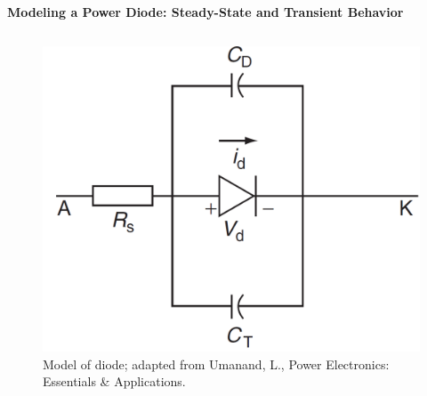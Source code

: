 \begin{frame}{\textbf{Modeling a Power Diode: Steady-State and Transient Behavior}}
\begin{columns}
\begin{column}{0.48\textwidth}
    \begin{figure}
        \centering
        \includegraphics[scale=0.25]{fig/lec04/diode_model.png}
        \caption{Model of diode; adapted from Umanand, L., Power Electronics: Essentials \& Applications.}
        \label{fig:diode_model}
    \end{figure}
\end{column}
\end{columns}
\end{frame}